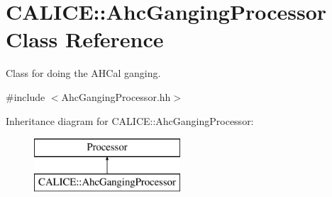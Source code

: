 \section{C\-A\-L\-I\-C\-E\-:\-:Ahc\-Ganging\-Processor Class Reference}
\label{classCALICE_1_1AhcGangingProcessor}


Class for doing the A\-H\-Cal ganging.  




{\ttfamily \#include $<$Ahc\-Ganging\-Processor.\-hh$>$}

Inheritance diagram for C\-A\-L\-I\-C\-E\-:\-:Ahc\-Ganging\-Processor\-:\begin{figure}[H]
\begin{center}
\leavevmode
\includegraphics[height=2.000000cm]{classCALICE_1_1AhcGangingProcessor}
\end{center}
\end{figure}
